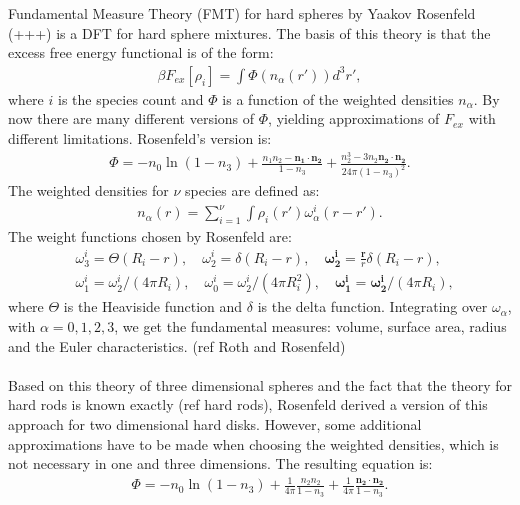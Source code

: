 \documentclass[11pt, a4paper]{article}
\theoremstyle{definition}
\begin{document}
Fundamental Measure Theory (FMT) for hard spheres by Yaakov Rosenfeld (+++) is a DFT for hard sphere mixtures. The basis of this theory is that the excess free energy functional is of the form:
\begin{align*}
	\beta F_{ex}[{\rho_i}] = \int \Phi({n_\alpha(r')})d^3r',
\end{align*} 
where $i$ is the species count and $\Phi$ is a function of the weighted densities $n_\alpha$. By now there are many different versions of $\Phi$, yielding approximations of $F_{ex}$ with different limitations. Rosenfeld's version is:
	\begin{align*}
	\Phi = -n_0 \ln(1-n_3) + \frac{n_1 n_2 - \mathbf{n_1} \cdot \mathbf{n_2}}{1-n_3} + \frac{n_2^3 - 3n_2 \mathbf{n_2} \cdot \mathbf{n_2}}{24 \pi (1-n_3)^2}.
	\end{align*}
The weighted densities for $\nu$ species are defined as:
	\begin{align*}
		n_\alpha (r) = \sum_{i=1}^\nu \int \rho_i(r') \omega_\alpha^i(r -r').
	\end{align*}
The weight functions chosen by Rosenfeld are:
\begin{align*}
	&\omega_3^i = \Theta(R_i -r),\quad \omega_2^i = \delta(R_i -r),\quad \mathbf{\omega_2^i} = \frac{\mathbf r}{r}\delta (R_i -r),\quad \\
	&\omega_1^i = \omega_2^i/(4 \pi R_i), \quad \omega_0^i = \omega_2^i/(4\pi R_i^2), \quad \mathbf{\omega_1^i} = \mathbf{\omega_2^i}/(4 \pi R_i),
\end{align*}
where $\Theta$ is the Heaviside function and $\delta$ is the delta function. Integrating over $\omega_\alpha$, with $\alpha = 0,1,2,3$, we get the fundamental measures: volume, surface area, radius and the Euler characteristics. (ref Roth and Rosenfeld)
\\
\\
Based on this theory of three dimensional spheres and the fact that the theory for hard rods is known exactly (ref hard rods), Rosenfeld derived a version of this approach for two dimensional hard disks. However, some additional approximations have to be made when choosing the weighted densities, which is not necessary in one and three dimensions. The resulting equation is:
\begin{align*}
	\Phi = - n_0 \ln(1-n_3) + \frac{1}{4 \pi} \frac{n_2 n_2}{1-n_3} + \frac{1}{4 \pi} \frac{\mathbf{n_2} \cdot \mathbf{n_2}}{1-n_3}.
\end{align*}
\\
\\
\end{document}
